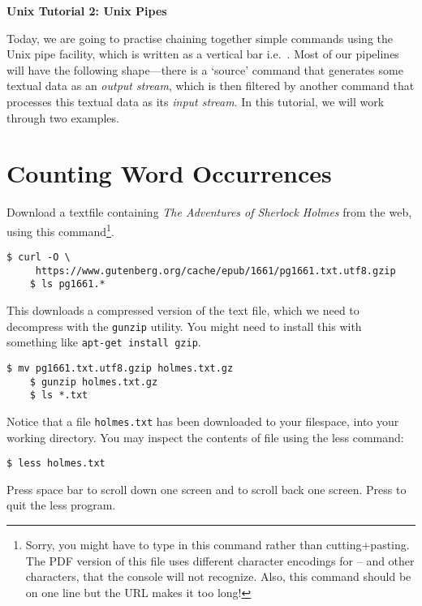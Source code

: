 \documentclass{article}
\begin{document}
\noindent
{\Large \textsf{\textbf{Unix Tutorial 2: Unix Pipes}}}

\bigskip


Today, we are going to practise chaining together simple commands using the Unix pipe facility, which is written as a vertical bar i.e.\ \textbar.
Most of our pipelines will have the following shape---there is a `source' command that generates some textual data as an \textit{output stream}, which is then filtered by another command that processes this textual data as its \textit{input stream}. In this tutorial, we will work through two examples.

\section*{Counting Word Occurrences}

Download a textfile containing \textit{The Adventures of Sherlock Holmes} from the web, using this command\footnote{Sorry, you might have to type in this command rather than cutting+pasting. The PDF version of this file uses different character encodings for -- and other characters, that the console will not recognize. Also, this command should be on one line but the URL makes it too long!}.
\begin{lstlisting}[style=BashInputStyle]
    $ curl -O \
     https://www.gutenberg.org/cache/epub/1661/pg1661.txt.utf8.gzip
    $ ls pg1661.*
\end{lstlisting}

This downloads a compressed version of the text file, which we need to decompress with the \texttt{gunzip} utility. You might need to install this with something like \texttt{apt-get install gzip}.

\begin{lstlisting}[style=BashInputStyle]
    $ mv pg1661.txt.utf8.gzip holmes.txt.gz
    $ gunzip holmes.txt.gz
    $ ls *.txt
\end{lstlisting}


Notice that a file \texttt{holmes.txt} has been downloaded to your filespace, into your working directory. You may inspect the contents of file using the less command:

\begin{lstlisting}[style=BashInputStyle]
    $ less holmes.txt
\end{lstlisting}

Press space bar to scroll down one screen and  to scroll back one screen. Press  to quit the less program.
\end{document}
